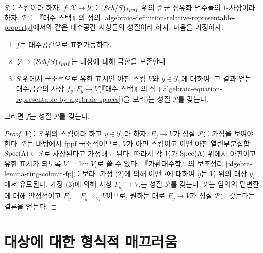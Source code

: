 \begin{lemma}
\label{lemma-check-property-limit-preserving}
$S$를 스킴이라 하자. $f : \mathcal{X} \to \mathcal{Y}$를
$(\mathit{Sch}/S)_{fppf}$ 위의 준군 섬유화 범주들의 $1$-사상이라 하자.
$\mathcal{P}$를 『대수 스택』의 정의
\ref{algebraic-definition-relative-representable-property}에서와 같은
대수공간 사상들의 성질이라 하자. 다음을 가정하자.
\begin{enumerate}
\item $f$는 대수공간으로 표현가능하다.
\item $\mathcal{Y} \to (\mathit{Sch}/S)_{fppf}$는 대상에 대해 극한을 보존한다.
\item $S$ 위에서 국소적으로 유한 표시인 아핀 스킴 $V$와
$y \in \mathcal{Y}_V$에 대하여, 그 결과 얻는 대수공간의 사상
$f_y : F_y \to V$(『대수 스택』의 식
(\ref{algebraic-equation-representable-by-algebraic-spaces})을 보라)는
성질 $\mathcal{P}$를 갖는다.
\end{enumerate}
그러면 $f$는 성질 $\mathcal{P}$를 갖는다.
\end{lemma}

\begin{proof}
$V$를 $S$ 위의 스킴이라 하고 $y \in \mathcal{Y}_V$라 하자.
$F_y \to V$가 성질 $\mathcal{P}$를 가짐을 보여야 한다.
$\mathcal{P}$는 바탕에서 fppf 국소적이므로, $V$가 아핀 스킴이고
어떤 아핀 열린부분집합 $\mathop{\mathrm{Spec}}(\Lambda) \subset S$로 사상된다고
가정해도 된다. 따라서 각 $V_i$가 $\mathop{\mathrm{Spec}}(\Lambda)$ 위에서 아핀이고
유한 표시가 되도록 $V = \lim V_i$로 쓸 수 있다.
『가환대수학』의 보조정리 \ref{algebra-lemma-ring-colimit-fp}를 보라.
가정 (2)에 의해 어떤 $i$에 대하여 $y$는 $V_i$ 위의 대상
$y_i$에서 유도된다. 가정 (3)에 의해 사상
$F_{y_i} \to V_i$는 성질 $\mathcal{P}$를 갖는다.
$\mathcal{P}$는 임의의 밑변환에 대해 안정적이고
$F_y = F_{y_i} \times_{V_i} V$이므로, 원하는 대로
$F_y \to V$가 성질 $\mathcal{P}$를 갖는다는 결론을 얻는다.
\end{proof}



\section{대상에 대한 형식적 매끄러움}
\label{section-formally-smooth}

